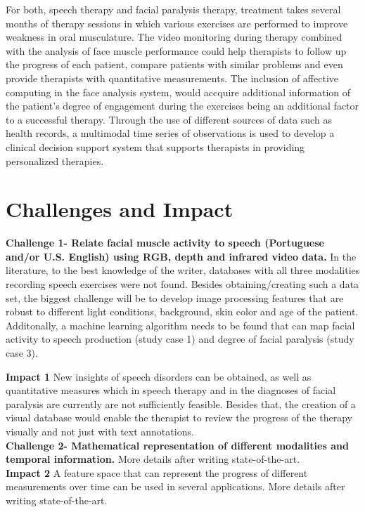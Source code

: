 For both, speech therapy and facial paralysis therapy, treatment takes several months of therapy sessions in which various exercises are performed to improve weakness in oral musculature. The video monitoring during therapy combined with the analysis of face muscle performance could help therapists to follow up the progress of each patient, compare patients with similar problems and even provide therapists with quantitative measurements. The inclusion of affective computing in the face analysis system, would accquire additional information of the patient's degree of engagement during the exercises being an additional factor to a successful therapy. Through the use of different sources of data such as health records, a multimodal time series of observations is used to develop a clinical decision support system that supports therapists in providing personalized therapies.

\section{Challenges and Impact}

\textbf{Challenge 1- Relate facial muscle activity to speech (Portuguese and/or U.S. English) using RGB, depth and infrared video data.}
In the literature, to the best knowledge of the writer, databases with all three modalities recording speech exercises were not found. Besides obtaining/creating such a data set, the biggest challenge will be to develop image processing features that are robust to different light conditions, background, skin color and age of the patient. Additonally, a machine learning algorithm needs to be found that can map facial activity to speech production (study case 1) and degree of facial paralysis (study case 3).

\textbf{Impact 1}
New insights of speech disorders can be obtained, as well as quantitative measures which in speech therapy and in the diagnoses of facial paralysis are currently are not sufficiently feasible. Besides that, the creation of a visual database would enable the therapist to review the progress of the therapy visually and not just with text annotations. \\

\textbf{Challenge 2- Mathematical representation of different modalities and temporal information.} More details after writing state-of-the-art. \\

\textbf{Impact 2} A feature space that can represent the progress of different measurements over time can be used in several applications. More details after writing state-of-the-art.\\

